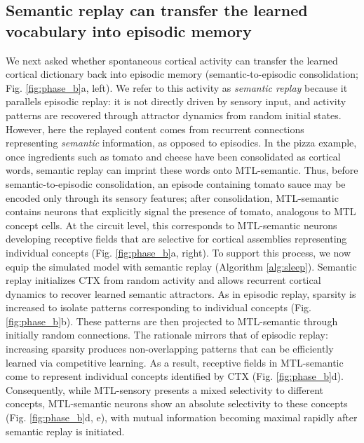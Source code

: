 \documentclass{article}
\begin{document}
\subsection*{Semantic replay can transfer the learned vocabulary into episodic memory}

We next asked whether spontaneous cortical activity can transfer the learned cortical dictionary back into episodic memory (semantic-to-episodic consolidation; Fig. \ref{fig:phase_b}a, left). We refer to this activity as \textit{semantic replay} because it parallels episodic replay: it is not directly driven by sensory input, and activity patterns are recovered through attractor dynamics from random initial states. However, here the replayed content comes from recurrent connections representing \textit{semantic} information, as opposed to episodics. In the pizza example, once ingredients such as tomato and cheese have been consolidated as cortical words, semantic replay can imprint these words onto MTL-semantic. Thus, before semantic-to-episodic consolidation, an episode containing tomato sauce may be encoded only through its sensory features; after consolidation, MTL-semantic contains neurons that explicitly signal the presence of tomato, analogous to MTL concept cells. At the circuit level, this corresponds to MTL-semantic neurons developing receptive fields that are selective for cortical assemblies representing individual concepts (Fig. \ref{fig:phase_b}a, right).
\newline\newline
To support this process, we now equip the simulated model with semantic replay (Algorithm \ref{alg:sleep}). Semantic replay initializes CTX from random activity and allows recurrent cortical dynamics to recover learned semantic attractors. As in episodic replay, sparsity is increased to isolate patterns corresponding to individual concepts (Fig. \ref{fig:phase_b}b). These patterns are then projected to MTL-semantic through initially random connections. The rationale mirrors that of episodic replay: increasing sparsity produces non-overlapping patterns that can be efficiently learned via competitive learning. As a result, receptive fields in MTL-semantic come to represent individual concepts identified by CTX (Fig. \ref{fig:phase_b}d). Consequently, while MTL-sensory presents a mixed selectivity to different concepts, MTL-semantic neurons show an absolute selectivity to these concepts (Fig. \ref{fig:phase_b}d, e), with mutual information becoming maximal rapidly after semantic replay is initiated.
\newline\newline
\end{document}
